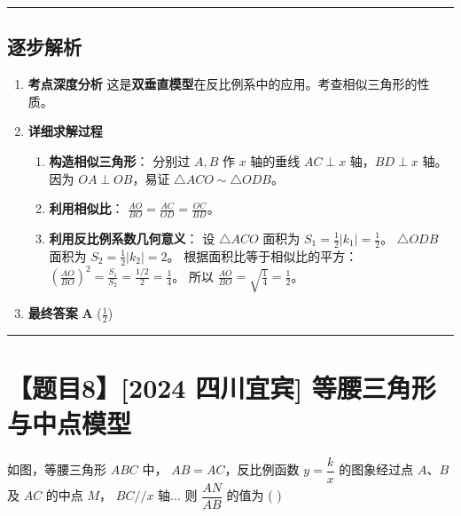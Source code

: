 \documentclass[UTF8]{ctexart}
\newenvironment{redenv}{\color{red}}{}
\newenvironment{detailedanalysis}{%
    \color{red}
    \begin{enumerate}[label=\textbf{第\arabic*步：}, leftmargin=*, align=left, itemsep=1.5ex]
}{%
    \end{enumerate}
}
\newcommand{\problemrule}{\noindent\rule{\textwidth}{1.5pt}\vspace{-0.8em}}
\newcommand{\analysisrule}{\noindent\rule{\textwidth}{0.8pt}\vspace{-0.8em}}
\begin{document}
\begin{redenv}
\analysisrule
\subsection*{逐步解析}

\begin{detailedanalysis}
\item \textbf{考点深度分析}
这是\textbf{双垂直模型}在反比例系中的应用。考查相似三角形的性质。

\item \textbf{详细求解过程}
\begin{enumerate}[label=\textbf{Step \arabic*.}]
    \item \textbf{构造相似三角形}：
    分别过 $A, B$ 作 $x$ 轴的垂线 $AC \perp x$ 轴，$BD \perp x$ 轴。
    因为 $OA \perp OB$，易证 $\triangle ACO \sim \triangle ODB$。
    
    \item \textbf{利用相似比}：
    $\frac{AO}{BO} = \frac{AC}{OD} = \frac{OC}{BD}$。
    
    \item \textbf{利用反比例系数几何意义}：
    设 $\triangle ACO$ 面积为 $S_1 = \frac{1}{2}|k_1| = \frac{1}{2}$。
    $\triangle ODB$ 面积为 $S_2 = \frac{1}{2}|k_2| = 2$。
    根据面积比等于相似比的平方：
    $(\frac{AO}{BO})^2 = \frac{S_1}{S_2} = \frac{1/2}{2} = \frac{1}{4}$。
    所以 $\frac{AO}{BO} = \sqrt{\frac{1}{4}} = \frac{1}{2}$。
\end{enumerate}

\item \textbf{最终答案}
\textbf{A} ($\frac{1}{2}$)
\end{detailedanalysis}
\end{redenv}

\problemrule
\section*{【题目8】[2024 四川宜宾] 等腰三角形与中点模型}
如图，等腰三角形 $ABC$ 中， $AB=AC$，反比例函数 $y=\dfrac{k}{x}$ 的图象经过点 $A$、$B$ 及 $AC$ 的中点 $M$， $BC // x$ 轴... 则 $\dfrac{AN}{AB}$ 的值为 ( \quad )
\end{document}
